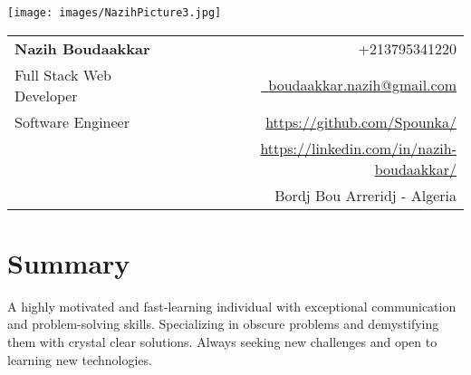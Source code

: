 \documentclass[a4paper,11pt]{article}
\makeatletter
\newcommand{\name}{Nazih Boudaakkar} %
\newcommand{\course}{Software Engineer} %
\newcommand{\phone}{795341220} %
\newcommand{\emaila}{boudaakkar.nazih@gmail.com} %
\newcommand{\address}{{Bordj Bou Arreridj - Algeria }} %
\newcommand{\github}{\url{https://github.com/Spounka/}}
\newcommand{\linkedIn}{\url{https://linkedin.com/in/nazih-boudaakkar/}}
\makeatother
\begin{document}
\selectfont


\parbox{2.6cm}{%
    \texttt{[image: images/NazihPicture3.jpg]}
}
\parbox{\dimexpr\linewidth-2.9cm\relax}{
    \begin{tabularx}{\linewidth}{L r}                                                                                                 \\
        \textbf{\Large \name}      & {\raisebox{0.0\height}{\footnotesize \faPhone}\ +213\phone}                          \\
        {Full Stack Web Developer} & {\href{mailto:\emaila}{\raisebox{0.0\height}{\footnotesize \faEnvelope}\ {\emaila}}} \\
        \course                    & {\raisebox{0.0\height}{\footnotesize \faGithub} \github}                             \\
        {}                         & {\raisebox{0.0\height}{\footnotesize \faLinkedin} \linkedIn}                         \\
        {}                         & {\raisebox{0.0\height}{\footnotesize \faLocationArrow} \address}                     \\
    \end{tabularx}
}



\section{\textbf{Summary}}
\vspace{2.5mm}
\raggedright
A highly motivated and fast-learning individual with exceptional communication and problem-solving skills. Specializing in obscure problems and demystifying them with crystal clear solutions. Always seeking new challenges and open to learning new technologies.





\vspace{-4.5mm}

\vspace{-3.5mm}

\vspace{-5.5mm}

\vspace{-5mm}



\end{document}
